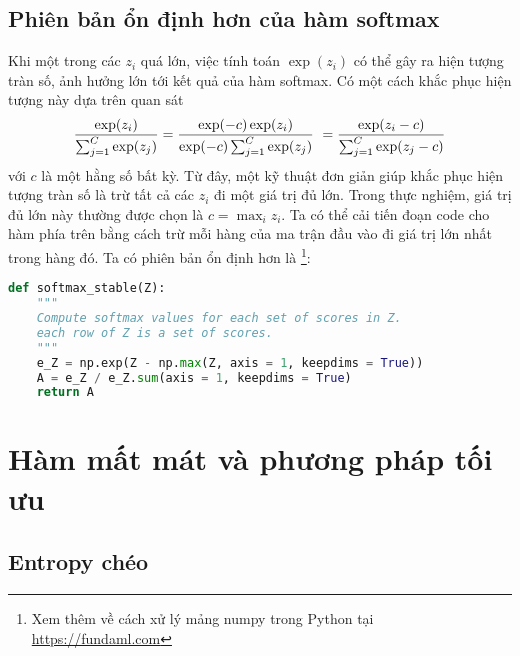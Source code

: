 \subsection{Phiên bản ổn định hơn của hàm softmax}
 Khi một trong các $z_i$ quá lớn, việc tính toán $\exp(z_i)$ có thể gây ra hiện
tượng tràn số, ảnh hưởng lớn tới kết quả của hàm
softmax. Có một cách khắc phục hiện tượng này dựa trên quan sát
\begin{equation} 
\frac{\exp(z_i)}{\sum_{j=1}^C \exp(z_j)} = \frac{\exp(-c)\exp(z_i)}{\exp(-c)\sum_{j=1}^C \exp(z_j)}\\\ 
= \frac{\exp(z_i-c)}{\sum_{j=1}^C \exp(z_j-c)} 
\end{equation} 
với $c$ là một hằng số bất kỳ. Từ đây, một kỹ thuật đơn giản giúp khắc phục hiện
tượng tràn số là trừ tất cả các $z_i$ đi một giá trị đủ lớn. Trong thực nghiệm,
giá trị đủ lớn này thường được chọn là $c = \max_i z_i$. Ta có thể cải tiến
đoạn code cho hàm \pythoninline{softmax} phía trên bằng cách trừ mỗi hàng của
ma trận đầu vào \pythoninline{Z} đi giá trị lớn nhất trong hàng đó. Ta có phiên
bản ổn định hơn là \pythoninline{softmax_stable}\footnote{Xem thêm về
cách xử lý mảng numpy trong Python tại \url{https://fundaml.com}}:
\begin{lstlisting}[language=Python]
def softmax_stable(Z):
    """
    Compute softmax values for each set of scores in Z.
    each row of Z is a set of scores.    
    """
    e_Z = np.exp(Z - np.max(Z, axis = 1, keepdims = True))
    A = e_Z / e_Z.sum(axis = 1, keepdims = True)
    return A
\end{lstlisting}
 
 
 
 
 
 
\section{Hàm mất mát và phương pháp tối ưu }
 
 
\subsection{Entropy chéo}

